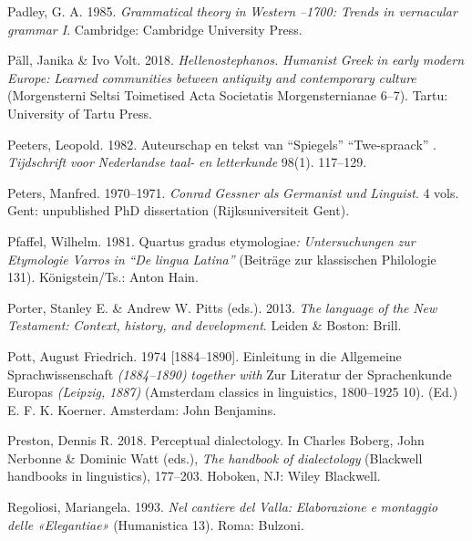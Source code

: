 Padley, G. A. 1985. \textit{Grammatical} \textit{theory} \textit{in} \textit{Western} \textit{\citealt{Europe1500}–1700: Trends in vernacular grammar I}. Cambridge: Cambridge University Press.

Päll, Janika \& Ivo Volt. 2018. \textit{Hellenostephanos.} \textit{Humanist} \textit{Greek} \textit{in} \textit{early} \textit{modern} \textit{Europe:} \textit{Learned} \textit{communities} \textit{between} \textit{antiquity} \textit{and} \textit{contemporary} \textit{culture} (Morgensterni Seltsi Toimetised {\textbar} Acta Societatis Morgensternianae 6–7). Tartu: University of Tartu Press.

Peeters, Leopold. 1982. Auteurschap en tekst van “Spiegels” “Twe-spraack” . \textit{Tijdschrift} \textit{voor} \textit{Nederlandse} \textit{taal-} \textit{en} \textit{letterkunde} 98(1). 117–129.

Peters, Manfred. 1970–1971. \textit{Conrad} \textit{Gessner} \textit{als} \textit{Germanist} \textit{und} \textit{Linguist}. 4 vols. Gent: unpublished PhD dissertation (Rijksuniversiteit Gent).

Pfaffel, Wilhelm. 1981. Quartus gradus etymologiae\textit{:} \textit{Untersuchungen} \textit{zur} \textit{Etymologie} \textit{Varros} \textit{in} \textit{“De} \textit{lingua} \textit{Latina”} (Beiträge zur klassischen Philologie 131). Königstein/Ts.: Anton Hain.

Porter, Stanley E. \& Andrew W. Pitts (eds.). 2013. \textit{The} \textit{language} \textit{of} \textit{the} \textit{New} \textit{Testament:} \textit{Context,} \textit{history,} \textit{and} \textit{development}. Leiden \& Boston: Brill.

Pott, August Friedrich. 1974 [1884–1890]. Einleitung in die Allgemeine Sprachwissenschaft \textit{(1884–1890)} \textit{together} \textit{with} Zur Literatur der Sprachenkunde Europas \textit{(Leipzig,} \textit{1887)} (Amsterdam classics in linguistics, 1800–1925 10). (Ed.) E. F. K. Koerner. Amsterdam: John Benjamins.

Preston, Dennis R. 2018. Perceptual dialectology. In Charles Boberg, John Nerbonne \& Dominic Watt (eds.), \textit{The} \textit{handbook} \textit{of} \textit{dialectology} (Blackwell handbooks in linguistics), 177–203. Hoboken, NJ: Wiley Blackwell.

Regoliosi, Mariangela. 1993. \textit{Nel} \textit{cantiere} \textit{del} \textit{Valla:} \textit{Elaborazione} \textit{e} \textit{montaggio} \textit{delle} \textit{«Elegantiae»} (Humanistica 13). Roma: Bulzoni.

